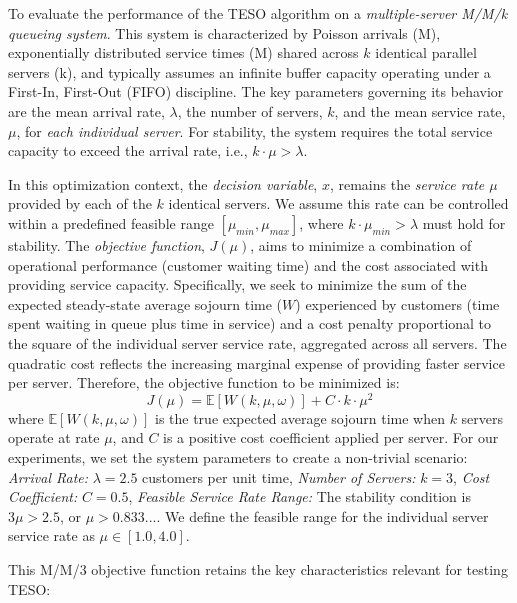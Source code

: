 \documentclass{article}
\begin{document}
To evaluate the performance of the TESO algorithm on a \textit{multiple-server M/M/k queueing system}. This system is characterized by Poisson arrivals (M), exponentially distributed service times (M) shared across $k$ identical parallel servers (k), and typically assumes an infinite buffer capacity operating under a First-In, First-Out (FIFO) discipline. The key parameters governing its behavior are the mean arrival rate, $\lambda$, the number of servers, $k$, and the mean service rate, $\mu$, for \textit{each individual server}. For stability, the system requires the total service capacity to exceed the arrival rate, i.e., $k \cdot \mu > \lambda$.

In this optimization context, the \textit{decision variable}, $x$, remains the \textit{service rate $\mu$} provided by each of the $k$ identical servers. We assume this rate can be controlled within a predefined feasible range $[\mu_{min}, \mu_{max}]$, where $k \cdot \mu_{min} > \lambda$ must hold for stability. The \textit{objective function}, $J(\mu)$, aims to minimize a combination of operational performance (customer waiting time) and the cost associated with providing service capacity. Specifically, we seek to minimize the sum of the expected steady-state average sojourn time ($W$) experienced by customers (time spent waiting in queue plus time in service) and a cost penalty proportional to the square of the individual server service rate, aggregated across all servers. The quadratic cost reflects the increasing marginal expense of providing faster service per server. Therefore, the objective function to be minimized is:
\begin{equation}
    J(\mu) = \mathbb{E}[W(k, \mu, \omega)] + C \cdot k \cdot \mu^2
    \label{eq:mmk_objective} %
\end{equation}
where $\mathbb{E}[W(k, \mu, \omega)]$ is the true expected average sojourn time when $k$ servers operate at rate $\mu$, and $C$ is a positive cost coefficient applied per server. For our experiments, we set the system parameters to create a non-trivial scenario: \textit{Arrival Rate:} $\lambda = 2.5$ customers per unit time, \textit{Number of Servers:} $k = 3$, \textit{Cost Coefficient:} $C = 0.5$, \textit{Feasible Service Rate Range:} The stability condition is $3\mu > 2.5$, or $\mu > 0.833...$. We define the feasible range for the individual server service rate as $\mu \in [1.0, 4.0]$.

This M/M/3 objective function retains the key characteristics relevant for testing TESO:
\end{document}
